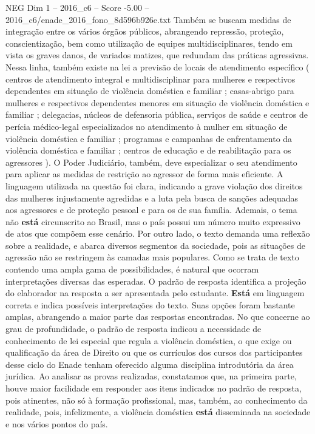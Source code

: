 \begin{textsample}{NEG Dim 1 – 2016\_c6 – Score -5.00 – 2016\_c6/enade\_2016\_fono\_8d596b926e.txt}
Também se buscam medidas de integração entre os vários órgãos públicos, abrangendo repressão, proteção, conscientização, bem como utilização de equipes multidisciplinares, tendo em vista os graves danos, de variados matizes, que redundam das práticas agressivas.
Nessa linha, também existe na lei a previsão de locais de atendimento específico ( centros de atendimento integral e multidisciplinar para mulheres e respectivos dependentes em situação de violência doméstica e familiar ; casas-abrigo para mulheres e respectivos dependentes menores em situação de violência doméstica e familiar ; delegacias, núcleos de defensoria pública, serviços de saúde e centros de perícia médico-legal especializados no atendimento à mulher em situação de violência doméstica e familiar ; programas e campanhas de enfrentamento da violência doméstica e familiar ; centros de educação e de reabilitação para os agressores ).
O Poder Judiciário, também, deve especializar o seu atendimento para aplicar as medidas de restrição ao agressor de forma mais eficiente.
A linguagem utilizada na questão foi clara, indicando a grave violação dos direitos das mulheres injustamente agredidas e a luta pela busca de sanções adequadas aos agressores e de proteção pessoal e para os de sua família.
Ademais, o tema não \textbf{está} circunscrito ao Brasil, mas o país possui um número muito expressivo de atos que compõem esse cenário.
Por outro lado, o texto demanda uma reflexão sobre a realidade, e abarca diversos segmentos da sociedade, pois as situações de agressão não se restringem às camadas mais populares.
Como se trata de texto contendo uma ampla gama de possibilidades, é natural que ocorram interpretações diversas das esperadas.
O padrão de resposta identifica a projeção do elaborador na resposta a ser apresentada pelo estudante. \textbf{Está} em linguagem correta e indica possíveis interpretações do texto.
Suas opções foram bastante amplas, abrangendo a maior parte das respostas encontradas.
No que concerne ao grau de profundidade, o padrão de resposta indicou a necessidade de conhecimento de lei especial que regula a violência doméstica, o que exige ou qualificação da área de Direito ou que os currículos dos cursos dos participantes desse ciclo do Enade tenham oferecido alguma disciplina introdutória da área jurídica.
Ao analisar as provas realizadas, constatamos que, na primeira parte, houve maior facilidade em responder aos itens indicados no padrão de resposta, pois atinentes, não só à formação profissional, mas, também, ao conhecimento da realidade, pois, infelizmente, a violência doméstica \textbf{está} disseminada na sociedade e nos vários pontos do país.

\end{textsample}
